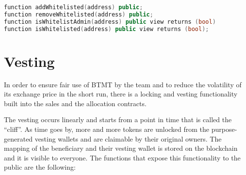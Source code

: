 \documentclass[a4paper,12pt]{article}
\begin{document}
\begin{lstlisting}[language=C++, caption=Solidity whitelisted private sale function signatures.]
function addWhitelisted(address) public;
function removeWhitelisted(address) public;
function isWhitelistAdmin(address) public view returns (bool)
function isWhitelisted(address) public view returns (bool);
\end{lstlisting}
%


\section{Vesting}

In order to ensure fair use of BTMT by the team and to reduce the volatility of its exchange price in the short run, there is a locking and vesting functionality built into the sales and the allocation contracts.

The vesting occurs linearly and starts from a point in time that is called the ``cliff''.
As time goes by, more and more tokens are unlocked from the purpose-generated vesting wallets and are claimable by their original owners.
The mapping of the beneficiary and their vesting wallet is stored on the blockchain and it is visible to everyone.
The functions that expose this functionality to the public are the following:
\end{document}
